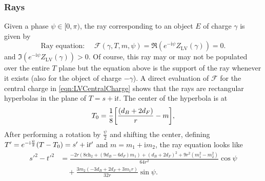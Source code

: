 \documentclass[11pt, a4paper]{article}
\newcommand{\ii}{\mathrm{i}}
\newcommand{\ch}{\mathrm{ch}}
\newcommand{\LV}{\mathrm{LV}}
\numberwithin{equation}{section}
\begin{document}
\subsubsection{Rays}
Given a phase $\psi \in [0, \pi)$, the ray corresponding to an object $E$ of charge $\gamma$ is given by
\begin{equation}
  \text{Ray equation: } \quad \mathcal{F}(\gamma, T, m, \psi) = \Re(e^{-\ii \psi} Z_\LV(\gamma)) = 0.
\end{equation}
and $\Im(e^{-\ii \psi} Z_\LV(\gamma)) > 0$. Of course, this ray may or may not be populated over the entire $T$ plane but the equation above is the support of the ray whenever it exists (also for the object of charge $-\gamma$).
A direct evaluation of $\mathcal{F}$ for the central charge in \cref{eqn:LVCentralCharge} shows that the rays are rectangular hyperbolas in the plane of $T = s + \ii t$. The center of the hyperbola is at
\begin{equation}
  T_0 = \frac18 \qty[\frac{(d_B + 2 d_F)}{r} - m],
\end{equation}
After performing a rotation by $\frac{\psi}{2}$ and shifting the center, defining $T' = e^{-\ii \frac{\psi}{2}}\qty(T - T_0) = s' + \ii t'$ and $m = m_1 + \ii m_2$, the ray equation looks like
\begin{equation}
  \begin{split}
    s'^2 - t'^2 &= \frac{-2 r (8 \ch_2+(9 d_B -6 d_F) m_1)+(d_B+2 d_F)^2+9 r^2 (m_1^2-m_2^2)}{64 r^2} \cos \psi \\
    &\quad + \frac{3 m_2 (-3 d_B+2 d_F+3 m_1 r)}{32 r} \sin \psi.
  \end{split}
\end{equation}
\end{document}
